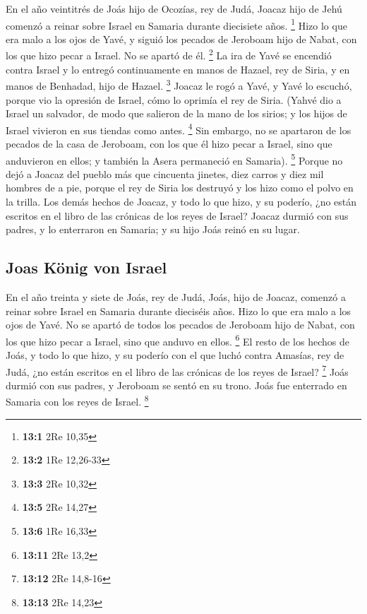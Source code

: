  En el año veintitrés de Joás hijo de Ocozías, rey de
Judá, Joacaz hijo de Jehú comenzó a reinar sobre Israel en Samaria
durante diecisiete años. \footnote{\textbf{13:1} 2Re 10,35}
 Hizo lo que era malo a los ojos de Yavé, y siguió los
pecados de Jeroboam hijo de Nabat, con los que hizo pecar a Israel. No
se apartó de él. \footnote{\textbf{13:2} 1Re 12,26-33}  La
ira de Yavé se encendió contra Israel y lo entregó continuamente en
manos de Hazael, rey de Siria, y en manos de Benhadad, hijo de Hazael.
\footnote{\textbf{13:3} 2Re 10,32}  Joacaz le rogó a Yavé,
y Yavé lo escuchó, porque vio la opresión de Israel, cómo lo oprimía el
rey de Siria.  (Yahvé dio a Israel un salvador, de modo
que salieron de la mano de los sirios; y los hijos de Israel vivieron en
sus tiendas como antes. \footnote{\textbf{13:5} 2Re 14,27}
 Sin embargo, no se apartaron de los pecados de la casa de
Jeroboam, con los que él hizo pecar a Israel, sino que anduvieron en
ellos; y también la Asera permaneció en Samaria). \footnote{\textbf{13:6}
  1Re 16,33}  Porque no dejó a Joacaz del pueblo más que
cincuenta jinetes, diez carros y diez mil hombres de a pie, porque el
rey de Siria los destruyó y los hizo como el polvo en la trilla.
 Los demás hechos de Joacaz, y todo lo que hizo, y su
poderío, ¿no están escritos en el libro de las crónicas de los reyes de
Israel?  Joacaz durmió con sus padres, y lo enterraron en
Samaria; y su hijo Joás reinó en su lugar.

\hypertarget{joas-kuxf6nig-von-israel}{%
\subsection{Joas König von Israel}\label{joas-kuxf6nig-von-israel}}

 En el año treinta y siete de Joás, rey de Judá, Joás,
hijo de Joacaz, comenzó a reinar sobre Israel en Samaria durante
dieciséis años.  Hizo lo que era malo a los ojos de Yavé.
No se apartó de todos los pecados de Jeroboam hijo de Nabat, con los que
hizo pecar a Israel, sino que anduvo en ellos. \footnote{\textbf{13:11}
  2Re 13,2}  El resto de los hechos de Joás, y todo lo
que hizo, y su poderío con el que luchó contra Amasías, rey de Judá, ¿no
están escritos en el libro de las crónicas de los reyes de Israel?
\footnote{\textbf{13:12} 2Re 14,8-16}  Joás durmió con
sus padres, y Jeroboam se sentó en su trono. Joás fue enterrado en
Samaria con los reyes de Israel. \footnote{\textbf{13:13} 2Re 14,23}

